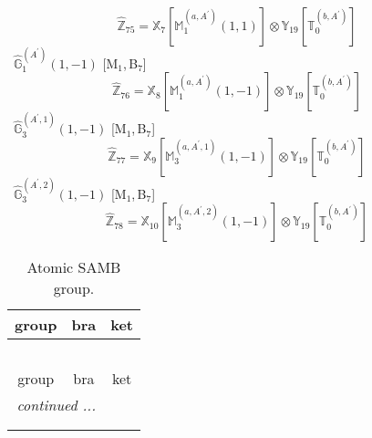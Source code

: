 \documentclass[fleqn,10pt,landscape]{article}
\begin{document}
\begin{itemize}
\begin{dmath*}
\hat{\mathbb{Z}}_{75}=\mathbb{X}_{7}[\mathbb{M}_{1}^{(a,A^{\prime})}(1,1)] \otimes\mathbb{Y}_{19}[\mathbb{T}_{0}^{(b,A^{\prime})}]
\end{dmath*}
\vspace{4mm}
\noindent {} $\,\,\,\hat{\mathbb{G}}_{1}^{(A^{\prime})}(1,-1)$ [M$_{1}$,\,B$_{7}$]
\begin{dmath*}
\hat{\mathbb{Z}}_{76}=\mathbb{X}_{8}[\mathbb{M}_{1}^{(a,A^{\prime})}(1,-1)] \otimes\mathbb{Y}_{19}[\mathbb{T}_{0}^{(b,A^{\prime})}]
\end{dmath*}
\vspace{4mm}
\noindent {} $\,\,\,\hat{\mathbb{G}}_{3}^{(A^{\prime},1)}(1,-1)$ [M$_{1}$,\,B$_{7}$]
\begin{dmath*}
\hat{\mathbb{Z}}_{77}=\mathbb{X}_{9}[\mathbb{M}_{3}^{(a,A^{\prime},1)}(1,-1)] \otimes\mathbb{Y}_{19}[\mathbb{T}_{0}^{(b,A^{\prime})}]
\end{dmath*}
\vspace{4mm}
\noindent {} $\,\,\,\hat{\mathbb{G}}_{3}^{(A^{\prime},2)}(1,-1)$ [M$_{1}$,\,B$_{7}$]
\begin{dmath*}
\hat{\mathbb{Z}}_{78}=\mathbb{X}_{10}[\mathbb{M}_{3}^{(a,A^{\prime},2)}(1,-1)] \otimes\mathbb{Y}_{19}[\mathbb{T}_{0}^{(b,A^{\prime})}]
\end{dmath*}
\begin{center}
\renewcommand{\arraystretch}{1.3}
\begin{longtable}{c|c|c}
\caption{Atomic SAMB group.}
 \\
 \hline \hline
group & bra & ket \\ \hline \endfirsthead

\multicolumn{2}{l}{\tablename\ \thetable{}} \\
 \hline \hline
group & bra & ket \\ \hline \endhead

 \hline \hline
\multicolumn{2}{r}{\footnotesize\it continued ...} \\ \endfoot

 \hline \hline
\multicolumn{2}{r}{} \\ \endlastfoot


\end{longtable}
\end{center}
\end{itemize}
\end{document}
